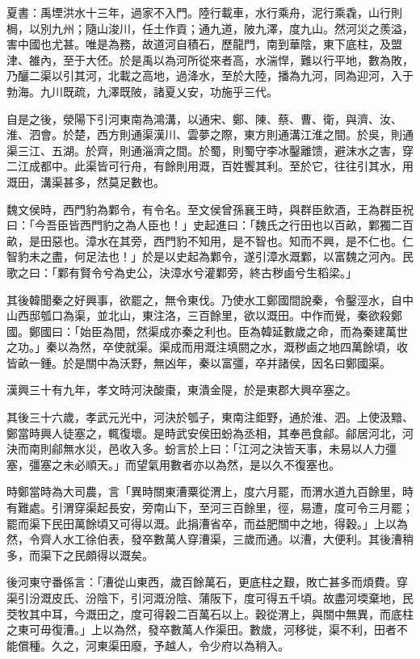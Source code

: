
\begin{pinyinscope}
夏書：禹堙洪水十三年，過家不入門。陸行載車，水行乘舟，泥行乘毳，山行則梮，以別九州；隨山浚川，任土作貢；通九道，陂九澤，度九山。然河災之羨溢，害中國也尤甚。唯是為務，故道河自積石，歷龍門，南到華陰，東下底柱，及盟津、雒內，至于大伾。於是禹以為河所從來者高，水湍悍，難以行平地，數為敗，乃釃二渠以引其河，北載之高地，過洚水，至於大陸，播為九河，同為迎河，入于勃海。九川既疏，九澤既陂，諸夏乂安，功施乎三代。

自是之後，滎陽下引河東南為鴻溝，以通宋、鄭、陳、蔡、曹、衛，與濟、汝、淮、泗會。於楚，西方則通渠漢川、雲夢之際，東方則通溝江淮之間。於吳，則通渠三江、五湖。於齊，則通淄濟之間。於蜀，則蜀守李冰鑿離馈，避沫水之害，穿二江成都中。此渠皆可行舟，有餘則用溉，百姓饗其利。至於它，往往引其水，用溉田，溝渠甚多，然莫足數也。

魏文侯時，西門豹為鄴令，有令名。至文侯曾孫襄王時，與群臣飲酒，王為群臣祝曰：「今吾臣皆西門豹之為人臣也！」史起進曰：「魏氏之行田也以百畝，鄴獨二百畝，是田惡也。漳水在其旁，西門豹不知用，是不智也。知而不興，是不仁也。仁智豹未之盡，何足法也！」於是以史起為鄴令，遂引漳水溉鄴，以富魏之河內。民歌之曰：「鄴有賢令兮為史公，決漳水兮灌鄴旁，終古秽鹵兮生稻梁。」

其後韓聞秦之好興事，欲罷之，無令東伐。乃使水工鄭國間說秦，令鑿涇水，自中山西邸瓠口為渠，並北山，東注洛，三百餘里，欲以溉田。中作而覺，秦欲殺鄭國。鄭國曰：「始臣為間，然渠成亦秦之利也。臣為韓延數歲之命，而為秦建萬世之功。」秦以為然，卒使就渠。渠成而用溉注填閼之水，溉秽鹵之地四萬餘頃，收皆畝一鍾。於是關中為沃野，無凶年，秦以富彊，卒并諸侯，因名曰鄭國渠。

漢興三十有九年，孝文時河決酸棗，東潰金隄，於是東郡大興卒塞之。

其後三十六歲，孝武元光中，河決於瓠子，東南注鉅野，通於淮、泗。上使汲黯、鄭當時興人徒塞之，輒復壞。是時武安侯田蚡為丞相，其奉邑食鄃。鄃居河北，河決而南則鄃無水災，邑收入多。蚡言於上曰：「江河之決皆天事，未易以人力彊塞，彊塞之未必順天。」而望氣用數者亦以為然，是以久不復塞也。

時鄭當時為大司農，言「異時關東漕粟從渭上，度六月罷，而渭水道九百餘里，時有難處。引渭穿渠起長安，旁南山下，至河三百餘里，徑，易遭，度可令三月罷；罷而渠下民田萬餘頃又可得以溉。此捐漕省卒，而益肥關中之地，得穀。」上以為然，令齊人水工徐伯表，發卒數萬人穿漕渠，三歲而通。以漕，大便利。其後漕稍多，而渠下之民頗得以溉矣。

後河東守番係言：「漕從山東西，歲百餘萬石，更底柱之艱，敗亡甚多而煩費。穿渠引汾溉皮氏、汾陰下，引河溉汾陰、蒲阪下，度可得五千頃。故盡河堧棄地，民茭牧其中耳，今溉田之，度可得穀二百萬石以上。穀從渭上，與關中無異，而底柱之東可毋復漕。」上以為然，發卒數萬人作渠田。數歲，河移徙，渠不利，田者不能償種。久之，河東渠田廢，予越人，令少府以為稍入。


\end{pinyinscope}
